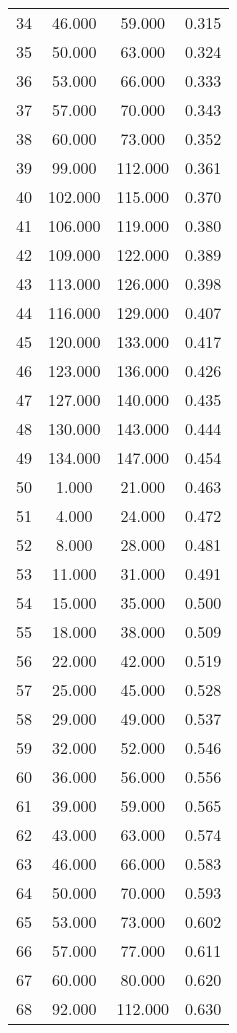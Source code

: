 \begin{tabular}{cccc}
  34 & 46.000 & 59.000 & 0.315 \\ 
  35 & 50.000 & 63.000 & 0.324 \\ 
  36 & 53.000 & 66.000 & 0.333 \\ 
  37 & 57.000 & 70.000 & 0.343 \\ 
  38 & 60.000 & 73.000 & 0.352 \\ 
  39 & 99.000 & 112.000 & 0.361 \\ 
  40 & 102.000 & 115.000 & 0.370 \\ 
  41 & 106.000 & 119.000 & 0.380 \\ 
  42 & 109.000 & 122.000 & 0.389 \\ 
  43 & 113.000 & 126.000 & 0.398 \\ 
  44 & 116.000 & 129.000 & 0.407 \\ 
  45 & 120.000 & 133.000 & 0.417 \\ 
  46 & 123.000 & 136.000 & 0.426 \\ 
  47 & 127.000 & 140.000 & 0.435 \\ 
  48 & 130.000 & 143.000 & 0.444 \\ 
  49 & 134.000 & 147.000 & 0.454 \\ 
  50 & 1.000 & 21.000 & 0.463 \\ 
  51 & 4.000 & 24.000 & 0.472 \\ 
  52 & 8.000 & 28.000 & 0.481 \\ 
  53 & 11.000 & 31.000 & 0.491 \\ 
  54 & 15.000 & 35.000 & 0.500 \\ 
  55 & 18.000 & 38.000 & 0.509 \\ 
  56 & 22.000 & 42.000 & 0.519 \\ 
  57 & 25.000 & 45.000 & 0.528 \\ 
  58 & 29.000 & 49.000 & 0.537 \\ 
  59 & 32.000 & 52.000 & 0.546 \\ 
  60 & 36.000 & 56.000 & 0.556 \\ 
  61 & 39.000 & 59.000 & 0.565 \\ 
  62 & 43.000 & 63.000 & 0.574 \\ 
  63 & 46.000 & 66.000 & 0.583 \\ 
  64 & 50.000 & 70.000 & 0.593 \\ 
  65 & 53.000 & 73.000 & 0.602 \\ 
  66 & 57.000 & 77.000 & 0.611 \\ 
  67 & 60.000 & 80.000 & 0.620 \\ 
  68 & 92.000 & 112.000 & 0.630 \\ 

\end{tabular}
